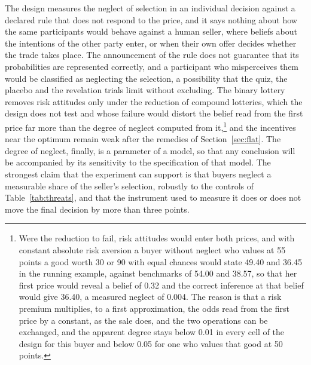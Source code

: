 \documentclass[11pt,a4paper]{article}
\begin{document}
The design measures the neglect of selection in an individual decision against a declared rule that does not respond to the price, and it says nothing about how the same participants would behave against a human seller, where beliefs about the intentions of the other party enter, or when their own offer decides whether the trade takes place. The announcement of the rule does not guarantee that its probabilities are represented correctly, and a participant who misperceives them would be classified as neglecting the selection, a possibility that the quiz, the placebo and the revelation trials limit without excluding. The binary lottery removes risk attitudes only under the reduction of compound lotteries, which the design does not test and whose failure would distort the belief read from the first price far more than the degree of neglect computed from it,\footnote{Were the reduction to fail, risk attitudes would enter both prices, and with constant absolute risk aversion a buyer without neglect who values at 55 points a good worth 30 or 90 with equal chances would state 49.40 and 36.45 in the running example, against benchmarks of 54.00 and 38.57, so that her first price would reveal a belief of 0.32 and the correct inference at that belief would give 36.40, a measured neglect of 0.004. The reason is that a risk premium multiplies, to a first approximation, the odds read from the first price by a constant, as the sale does, and the two operations can be exchanged, and the apparent degree stays below 0.01 in every cell of the design for this buyer and below 0.05 for one who values that good at 50 points.} and the incentives near the optimum remain weak after the remedies of Section~\ref{sec:flat}. The degree of neglect, finally, is a parameter of a model, so that any conclusion will be accompanied by its sensitivity to the specification of that model. The strongest claim that the experiment can support is that buyers neglect a measurable share of the seller's selection, robustly to the controls of Table~\ref{tab:threats}, and that the instrument used to measure it does or does not move the final decision by more than three points.
\end{document}
